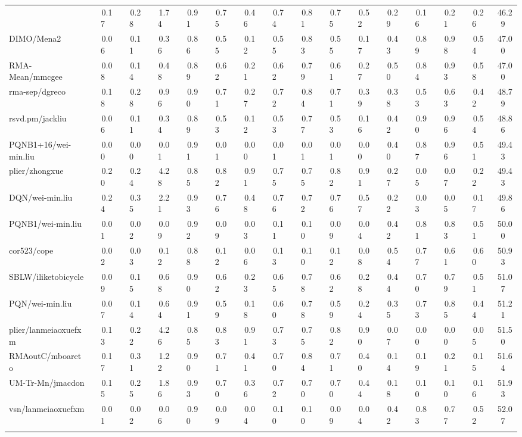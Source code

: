 \begin{table}[hptb]
\begin{center}
\begin{tabular}{|l||c|c|c|c|c|c|c|c|c|c|c|c|c|c|c|}
{rsvd2/jack.liu&~~0.17&~~0.28&~~1.74&~~0.91&~~0.75&~~0.46&~~0.74&~~0.81&~~0.75&~~0.52&~~0.29&~~0.16&~~0.21&~~0.26&~46.29\\ 
DIMO/Mena2&~~0.06&~~0.11&~~0.36&~~0.86&~~0.55&~~0.12&~~0.55&~~0.83&~~0.55&~~0.17&~~0.43&~~0.89&~~0.98&~~0.54&~47.00\\ 
RMA-Mean/mmcgee&~~0.08&~~0.14&~~0.48&~~0.89&~~0.62&~~0.21&~~0.62&~~0.79&~~0.61&~~0.27&~~0.50&~~0.84&~~0.93&~~0.58&~47.00\\ 
rma-sep/dgreco&~~0.18&~~0.28&~~0.96&~~0.90&~~0.71&~~0.27&~~0.72&~~0.84&~~0.71&~~0.39&~~0.38&~~0.53&~~0.63&~~0.42&~48.79\\ 
rsvd.pm/jackliu&~~0.06&~~0.11&~~0.34&~~0.89&~~0.53&~~0.12&~~0.53&~~0.77&~~0.53&~~0.16&~~0.42&~~0.90&~~0.96&~~0.54&~48.86\\ 
PQNB1+16/wei-min.liu&~~0.00&~~0.00&~~0.01&~~0.91&~~0.01&~~0.00&~~0.01&~~0.01&~~0.01&~~0.00&~~0.40&~~0.87&~~0.96&~~0.51&~49.43\\ 
plier/zhongxue&~~0.20&~~0.24&~~4.28&~~0.85&~~0.82&~~0.91&~~0.75&~~0.75&~~0.82&~~0.91&~~0.27&~~0.05&~~0.07&~~0.22&~49.43\\ 
DQN/wei-min.liu&~~0.24&~~0.35&~~2.21&~~0.93&~~0.76&~~0.48&~~0.76&~~0.72&~~0.76&~~0.57&~~0.22&~~0.03&~~0.05&~~0.17&~49.86\\ 
PQNB1/wei-min.liu&~~0.01&~~0.02&~~0.09&~~0.92&~~0.09&~~0.03&~~0.11&~~0.10&~~0.09&~~0.04&~~0.42&~~0.81&~~0.83&~~0.51&~50.00\\ 
cor523/cope&~~0.02&~~0.03&~~0.12&~~0.88&~~0.12&~~0.06&~~0.13&~~0.10&~~0.12&~~0.08&~~0.54&~~0.77&~~0.61&~~0.60&~50.93\\ 
SBLW/iliketobicycle&~~0.09&~~0.15&~~0.68&~~0.90&~~0.62&~~0.23&~~0.65&~~0.78&~~0.62&~~0.28&~~0.44&~~0.70&~~0.79&~~0.51&~51.07\\ 
PQN/wei-min.liu&~~0.07&~~0.14&~~0.64&~~0.91&~~0.59&~~0.18&~~0.60&~~0.78&~~0.59&~~0.24&~~0.35&~~0.73&~~0.85&~~0.44&~51.21\\ 
plier/lanmeiaoxuefxm&~~0.13&~~0.22&~~4.26&~~0.85&~~0.83&~~0.91&~~0.73&~~0.75&~~0.82&~~0.90&~~0.07&~~0.00&~~0.00&~~0.05&~51.50\\ 
RMAoutC/mboareto&~~0.17&~~0.31&~~1.22&~~0.90&~~0.71&~~0.41&~~0.70&~~0.84&~~0.71&~~0.40&~~0.14&~~0.19&~~0.21&~~0.15&~51.64\\ 
UM-Tr-Mn/jmacdon&~~0.15&~~0.25&~~1.86&~~0.93&~~0.70&~~0.36&~~0.72&~~0.70&~~0.70&~~0.44&~~0.18&~~0.10&~~0.10&~~0.16&~51.93\\ 
vsn/lanmeiaoxuefxm&~~0.01&~~0.02&~~0.06&~~0.90&~~0.09&~~0.04&~~0.10&~~0.10&~~0.09&~~0.04&~~0.42&~~0.83&~~0.77&~~0.52&~52.07\\ 
}
\end{tabular}
\end{center}
\end{table}
